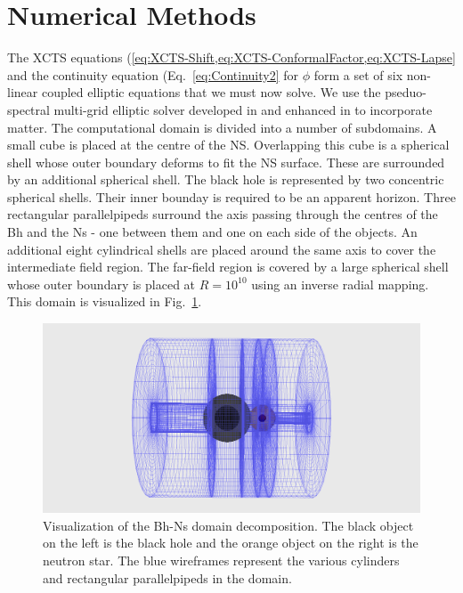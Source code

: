 \section{Numerical Methods}
\label{sec:NumMethods}
The XCTS equations
(\cref{eq:XCTS-Shift,eq:XCTS-ConformalFactor,eq:XCTS-Lapse} and the
continuity equation (Eq.~\ref{eq:Continuity2} for $\phi$ form a set
of six non-linear coupled elliptic equations that we must now solve. We use the
pseduo-spectral multi-grid elliptic solver developed in
\cite{Pfeiffer2003} and enhanced in \cite{FoucartEtAl:2008} to incorporate matter. The computational domain is divided into a number of subdomains. A small cube is placed at the centre of the NS. Overlapping this cube is a spherical shell whose outer boundary deforms to fit the NS surface. These are surrounded by an additional spherical shell. The black hole is represented by two concentric spherical shells. Their inner bounday is required to be an apparent horizon. Three rectangular parallelpipeds surround the axis passing through the centres of the Bh and the Ns - one between them and one on each side of the objects. An additional eight cylindrical shells are placed around the same axis to cover the intermediate field region. The far-field region is covered by a large spherical shell whose outer boundary is placed at $R=10^{10}$ using an inverse radial mapping. This domain is visualized in Fig.~\ref{fig:BhNsDomain}.

\begin{center}
\begin{figure}[!ht]
\includegraphics[scale=0.45]{chap4/BhNsDomain.png}
\caption[Visualization of the Bh-Ns domain
decomposition.]{Visualization of the Bh-Ns domain decomposition. The
  black object on the left is the black hole and the orange object on
  the right is the neutron star. The blue wireframes represent the
  various cylinders and rectangular parallelpipeds in the
  domain. }
\label{fig:BhNsDomain}

\end{figure}
\end{center}

